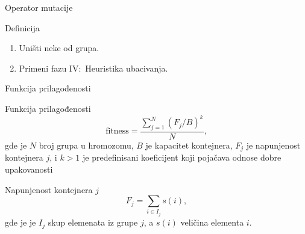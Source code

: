 \documentclass[aspectratio=169,xcolor=dvipsnames]{beamer}
\begin{document}

\begin{frame}{Operator mutacije}
    \begin{block}{Definicija}
        \begin{enumerate}
            \item Uništi neke od grupa.
            \item Primeni fazu IV:\ Heuristika ubacivanja.
        \end{enumerate}
    \end{block}
\end{frame}


\begin{frame}{Funkcija prilagođenosti}
    \begin{block}{Funkcija prilagođenosti}
        \begin{equation}
            \text{fitness} = \frac{\sum_{j = 1}^N {(F_j/B)}^k}{N},
        \end{equation}
        gde je $N$ broj grupa u hromozomu, $B$ je kapacitet kontejnera, $F_j$
        je napunjenost kontejnera $j$, i $k > 1$ je predefinisani koeficijent 
        koji pojačava odnose dobre upakovanosti
    \end{block}
    \begin{block}{Napunjenost kontejnera $j$}
        \begin{equation}
            F_j = \sum_{i \in I_j} s(i),
        \end{equation}
        gde je je $I_j$ skup elemenata iz grupe $j$, a $s(i)$ veličina 
        elementa $i$.
    \end{block}
\end{frame}

\end{document}
